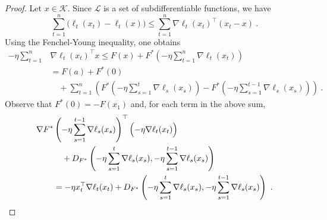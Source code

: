 \documentclass[11pt]{hackednow}
\newcommand{\cL}{\mathcal{L}}
\newcommand{\cK}{\mathcal{K}}
\begin{document}
%
\begin{proof}
Let $x \in \cK$. Since $\cL$ is a set of subdifferentiable functions, we have
$$\sum_{t=1}^n \bigl( \ell_t(x_t) - \ell_t(x) \bigr) \leq \sum_{t=1}^n \nabla \ell_t(x_t)^{\top} (x_t -x)~.$$ Using the Fenchel-Young inequality, one obtains
\begin{align*}
- \eta \sum_{t=1}^n &\nabla \ell_t(x_t)^{\top} x
\leq
    F(x) + F^*\left( - \eta \sum_{t=1}^{n} \nabla \ell_t(x_t) \right)
\\&=
    F(a) + F^*(0) \\ & \quad + \sum_{t=1}^n \left( F^*\left( - \eta \sum_{s=1}^{t} \nabla \ell_s(x_s)\right)  - F^*\left( - \eta \sum_{s=1}^{t-1} \nabla \ell_s(x_s)\right) \right)~.
\end{align*}
Observe that $F^*(0)= - F(x_1)$ and, for each term in the above sum,
\begin{align*}
    \nabla F^*&\left( - \eta \sum_{s=1}^{t-1} \nabla \ell_s(x_s) \right)^{\top} \Bigl(- \eta \nabla \ell_t(x_t)\Bigr)
\\& \quad
    + D_{F^*}\left(- \eta \sum_{s=1}^{t} \nabla \ell_s(x_s), - \eta \sum_{s=1}^{t-1} \nabla \ell_s(x_s)\right)
\\ &=
    - \eta x_t^{\top} \nabla \ell_t(x_t) + D_{F^*}\left(- \eta \sum_{s=1}^{t} \nabla \ell_s(x_s), - \eta \sum_{s=1}^{t-1} \nabla \ell_s(x_s) \right)~.
\end{align*}
\end{proof}
\end{document}
